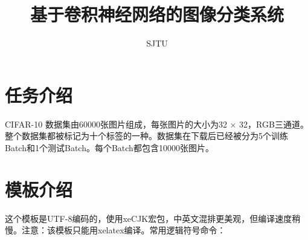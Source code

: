 \documentclass[UTF8,12pt]{article} %
\theoremstyle{definition}
\begin{document}
\title{基于卷积神经网络的图像分类系统}
\author{SJTU}
\maketitle

\section{任务介绍}
CIFAR-10 数据集由60000张图片组成，每张图片的大小为32 $\times$ 32，RGB三通道。整个数据集都被标记为十个标签的一种。数据集在下载后已经被分为5个训练Batch和1个测试Batch。每个Batch都包含10000张图片。\cite{krizhevsky2009learning}

\section{模板介绍}
这个模板是UTF-8编码的，使用xeCJK宏包，中英文混排更美观，但编译速度稍慢。注意：该模板只能用xelatex编译。常用逻辑符号命令：
\end{document}
